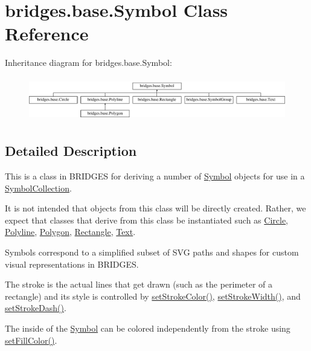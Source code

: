 \hypertarget{classbridges_1_1base_1_1_symbol}{}\section{bridges.\+base.\+Symbol Class Reference}
\label{classbridges_1_1base_1_1_symbol}
Inheritance diagram for bridges.\+base.\+Symbol\+:\begin{figure}[H]
\begin{center}
\leavevmode
\includegraphics[height=1.942196cm]{classbridges_1_1base_1_1_symbol}
\end{center}
\end{figure}


\subsection{Detailed Description}
This is a class in B\+R\+I\+D\+G\+ES for deriving a number of \hyperlink{classbridges_1_1base_1_1_symbol}{Symbol} objects for use in a \hyperlink{classbridges_1_1base_1_1_symbol_collection}{Symbol\+Collection}. 

It is not intended that objects from this class will be directly created. Rather, we expect that classes that derive from this class be instantiated such as \hyperlink{classbridges_1_1base_1_1_circle}{Circle}, \hyperlink{classbridges_1_1base_1_1_polyline}{Polyline}, \hyperlink{classbridges_1_1base_1_1_polygon}{Polygon}, \hyperlink{classbridges_1_1base_1_1_rectangle}{Rectangle}, \hyperlink{classbridges_1_1base_1_1_text}{Text}.

Symbols correspond to a simplified subset of S\+VG paths and shapes for custom visual representations in B\+R\+I\+D\+G\+ES.

The stroke is the actual lines that get drawn (such as the perimeter of a rectangle) and its style is controlled by \hyperlink{classbridges_1_1base_1_1_symbol_a10abfbf4651ffdc630121da84e23b116}{set\+Stroke\+Color()}, \hyperlink{classbridges_1_1base_1_1_symbol_a4b1ce1fdbc8e76538e67a292e150083c}{set\+Stroke\+Width()}, and \hyperlink{classbridges_1_1base_1_1_symbol_ad36224ec7cb588dbbaa8040ef59ffbfc}{set\+Stroke\+Dash()}.

The inside of the \hyperlink{classbridges_1_1base_1_1_symbol}{Symbol} can be colored independently from the stroke using \hyperlink{classbridges_1_1base_1_1_symbol_a5d3faeffe2dbff7207a4f3d663a34763}{set\+Fill\+Color()}.

